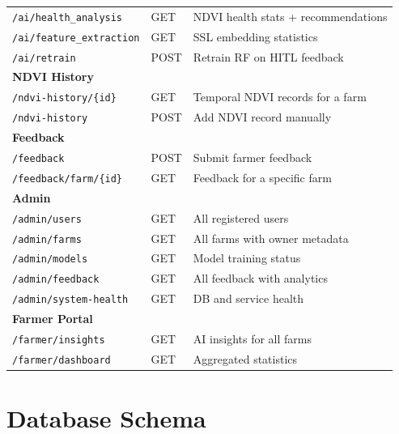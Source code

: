 \documentclass[12pt,a4paper,oneside]{report}
\begin{document}
\begin{longtable}{p{3.8cm}p{1.6cm}p{7.2cm}}
\texttt{/ai/health\_analysis}  &GET   &NDVI health stats + recommendations\\
\texttt{/ai/feature\_extraction}&GET  &SSL embedding statistics\\
\texttt{/ai/retrain}           &POST  &Retrain RF on HITL feedback\\[4pt]
\multicolumn{3}{l}{\textbf{NDVI History}}\\
\texttt{/ndvi-history/\{id\}}  &GET   &Temporal NDVI records for a farm\\
\texttt{/ndvi-history}         &POST  &Add NDVI record manually\\[4pt]
\multicolumn{3}{l}{\textbf{Feedback}}\\
\texttt{/feedback}             &POST  &Submit farmer feedback\\
\texttt{/feedback/farm/\{id\}} &GET   &Feedback for a specific farm\\[4pt]
\multicolumn{3}{l}{\textbf{Admin}}\\
\texttt{/admin/users}          &GET   &All registered users\\
\texttt{/admin/farms}          &GET   &All farms with owner metadata\\
\texttt{/admin/models}         &GET   &Model training status\\
\texttt{/admin/feedback}       &GET   &All feedback with analytics\\
\texttt{/admin/system-health}  &GET   &DB and service health\\[4pt]
\multicolumn{3}{l}{\textbf{Farmer Portal}}\\
\texttt{/farmer/insights}      &GET   &AI insights for all farms\\
\texttt{/farmer/dashboard}     &GET   &Aggregated statistics\\
\end{longtable}

\chapter{Database Schema}
\label{app:db}
\end{document}
